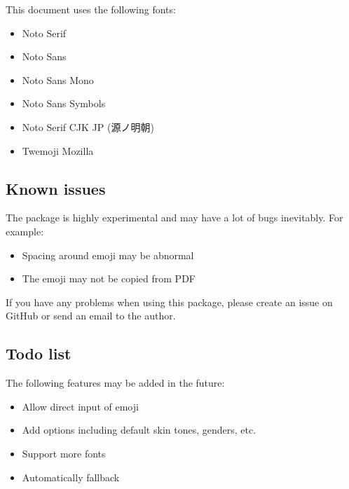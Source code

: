 \documentclass{l3doc}
\newcounter { emoji }
\begin{document}
\endgroup

This document uses the following fonts:

\begin{itemize}
  \item Noto Serif
  \item Noto Sans
  \item Noto Sans Mono
  \item Noto Sans Symbols
  \item Noto Serif CJK JP ({\fontja 源ノ明朝})
  \item Twemoji Mozilla
\end{itemize}

\subsection{ Known issues}

The  package is highly experimental and may have a lot of bugs inevitably. For example:

\begin{itemize}
  \item Spacing around emoji may be abnormal
  \item The emoji may not be copied from PDF
\end{itemize}

If you have any problems when using this package, please create an issue on GitHub or send
an email to the author.

\subsection{ Todo list}

The following features may be added in the future:

\begin{itemize}
  \item Allow direct input of emoji
  \item Add options including default skin tones, genders, etc.
  \item Support more fonts
  \item Automatically fallback
\end{itemize}
\end{document}
